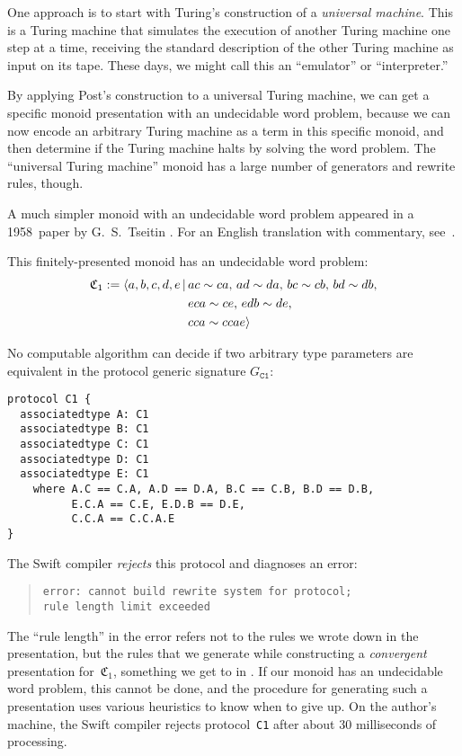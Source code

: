 \documentclass[../generics]{subfiles}
\begin{document}
One approach is to start with Turing's construction of a \emph{universal machine}. This is a Turing machine that simulates the execution of another Turing machine one step at a time, receiving the standard description of the other Turing machine as input on its tape. These days, we might call this an ``emulator'' or ``interpreter.''

By applying Post's construction to a universal Turing machine, we can get a specific monoid presentation with an undecidable word problem, because we can now encode an arbitrary Turing machine as a term in this specific monoid, and then determine if the Turing machine halts by solving the word problem. The ``universal Turing machine'' monoid has a large number of generators and rewrite rules, though.

A much simpler monoid with an undecidable word problem appeared in a 1958~paper by G.~S.~Tseitin \cite{undecidablesemigroup}. For an English translation with commentary, see~\cite{nybergbrodda2024g}.

\newcommand{\Ts}{\mathfrak{C}_1}

\begin{theorem}\label{undecidablemonoid}
This finitely-presented monoid has an undecidable word problem:
\begin{align*}
\Ts := \Pres{a,b,c,d,e}{&ac\sim ca,\,ad\sim da,\,bc\sim cb,\,bd\sim db,\\
&eca\sim ce,\,edb\sim de,\\
&cca\sim ccae}
\end{align*}
\end{theorem}
\begin{corollary}
No computable algorithm can decide if two arbitrary type parameters are equivalent in the protocol generic signature $G_\texttt{C1}$:
\begin{Verbatim}
protocol C1 {
  associatedtype A: C1
  associatedtype B: C1
  associatedtype C: C1
  associatedtype D: C1
  associatedtype E: C1
    where A.C == C.A, A.D == D.A, B.C == C.B, B.D == D.B,
          E.C.A == C.E, E.D.B == D.E,
          C.C.A == C.C.A.E
}
\end{Verbatim}
The Swift compiler \emph{rejects} this protocol and diagnoses an error:
\begin{quote}
\begin{verbatim}
error: cannot build rewrite system for protocol;
rule length limit exceeded
\end{verbatim}
\end{quote}
The ``rule length'' in the error refers not to the rules we wrote down in the presentation, but the rules that we generate while constructing a \emph{convergent} presentation for~$\Ts$, something we get to in . If our monoid has an undecidable word problem, this cannot be done, and the procedure for generating such a presentation uses various heuristics to know when to give up. On the author's machine, the Swift compiler rejects protocol~\texttt{C1} after about 30 milliseconds of processing.
\end{corollary}
\end{document}
